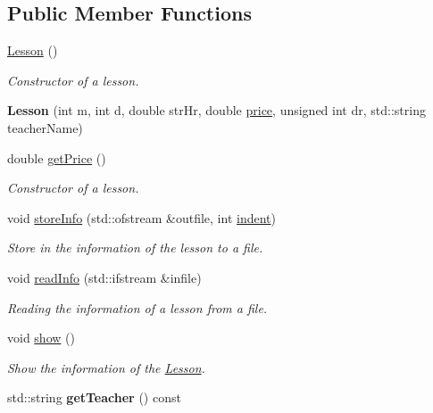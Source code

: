 \subsection*{Public Member Functions}
\begin{DoxyCompactItemize}
\item 
\mbox{\label{class_lesson_a1f6ed0da97171480b7d6d5696d6f2afc}} 
\mbox{\hyperlink{class_lesson_a1f6ed0da97171480b7d6d5696d6f2afc}{Lesson}} ()
\begin{DoxyCompactList}\small\item\em Constructor of a lesson. \end{DoxyCompactList}\item 
\mbox{\label{class_lesson_ad251882cdd4509899ff22cf4a5061e85}} 
{\bfseries Lesson} (int m, int d, double str\+Hr, double \mbox{\hyperlink{class_reservation_a82e197bd30e7949ee9b8616ee4eacf83}{price}}, unsigned int dr, std\+::string teacher\+Name)
\item 
double \mbox{\hyperlink{class_lesson_ad7a2f708f870040627a442cdf000683f}{get\+Price}} ()
\begin{DoxyCompactList}\small\item\em Constructor of a lesson. \end{DoxyCompactList}\item 
void \mbox{\hyperlink{class_lesson_a645855060ab3c915a6e0875bc5584887}{store\+Info}} (std\+::ofstream \&outfile, int \mbox{\hyperlink{class_reservation_a480981ed050bae19bc74bbb0bbb459f9}{indent}})
\begin{DoxyCompactList}\small\item\em Store in the information of the lesson to a file. \end{DoxyCompactList}\item 
void \mbox{\hyperlink{class_lesson_a3ac64e2f79bc9e381634d5d30499e8f1}{read\+Info}} (std\+::ifstream \&infile)
\begin{DoxyCompactList}\small\item\em Reading the information of a lesson from a file. \end{DoxyCompactList}\item 
\mbox{\label{class_lesson_add2dea9a07935a757249e1c0ed0d79e1}} 
void \mbox{\hyperlink{class_lesson_add2dea9a07935a757249e1c0ed0d79e1}{show}} ()
\begin{DoxyCompactList}\small\item\em Show the information of the \mbox{\hyperlink{class_lesson}{Lesson}}. \end{DoxyCompactList}\item 
\mbox{\label{class_lesson_ae0681fd75bb70c1b91f0a1999524c5ce}} 
std\+::string {\bfseries get\+Teacher} () const
\end{DoxyCompactItemize}
